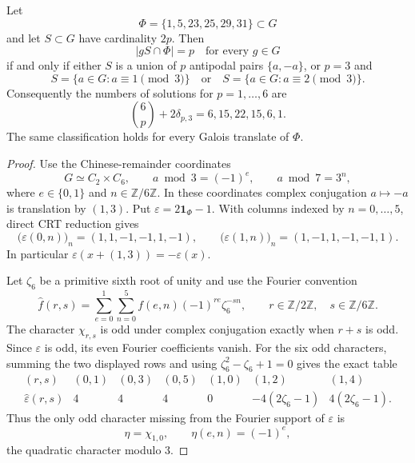 \begin{lemma}\label{lem:primitivebinary}
Let
\[
 \Phi=\{1,5,23,25,29,31\}\subset G
\]
and let $S\subset G$ have cardinality $2p$.  Then
\[
 |gS\cap\Phi|=p\quad\text{for every }g\in G
\]
if and only if either $S$ is a union of $p$ antipodal pairs
$\{a,-a\}$, or $p=3$ and
\[
 S=\{a\in G:a\equiv1\pmod3\}
 \quad\text{or}\quad
 S=\{a\in G:a\equiv2\pmod3\}.
\]
Consequently the numbers of solutions for $p=1,\ldots,6$ are
\[
 \binom6p+2\delta_{p,3}=6,15,22,15,6,1.
\]
The same classification holds for every Galois translate of $\Phi$.
\end{lemma}
\begin{proof}
Use the Chinese-remainder coordinates
\[
 G\simeq C_2\times C_6,\qquad
 a\bmod3=(-1)^e,\qquad a\bmod7=3^n,
\]
where $e\in\{0,1\}$ and $n\in\mathbb Z/6\mathbb Z$.  In these coordinates
complex conjugation $a\mapsto-a$ is translation by $(1,3)$.  Put
$\varepsilon=2\mathbf 1_\Phi-1$.  With columns indexed by $n=0,\ldots,5$,
direct CRT reduction gives
\[
 \bigl(\varepsilon(0,n)\bigr)_n=(1,1,-1,-1,1,-1),
 \qquad
 \bigl(\varepsilon(1,n)\bigr)_n=(1,-1,1,-1,-1,1).
\]
In particular $\varepsilon(x+(1,3))=-\varepsilon(x)$.

Let $\zeta_6$ be a primitive sixth root of unity and use the Fourier
convention
\[
 \widehat f(r,s)=\sum_{e=0}^1\sum_{n=0}^5
 f(e,n)(-1)^{re}\zeta_6^{-sn},
 \qquad r\in\mathbb Z/2\mathbb Z,\quad s\in\mathbb Z/6\mathbb Z.
\]
The character $\chi_{r,s}$ is odd under complex conjugation exactly when
$r+s$ is odd.  Since $\varepsilon$ is odd, its even Fourier coefficients
vanish.  For the six odd characters, summing the two displayed rows and using
$\zeta_6^2-\zeta_6+1=0$ gives the exact table
\[
\begin{array}{c|cccccc}
 (r,s)&(0,1)&(0,3)&(0,5)&(1,0)&(1,2)&(1,4)\\ \hline
 \widehat\varepsilon(r,s)
 &4&4&4&0&-4(2\zeta_6-1)&4(2\zeta_6-1).
\end{array}
\]
Thus the only odd character missing from the Fourier support of
$\varepsilon$ is
\[
 \eta=\chi_{1,0},\qquad \eta(e,n)=(-1)^e,
\]
the quadratic character modulo $3$.


\end{proof}
